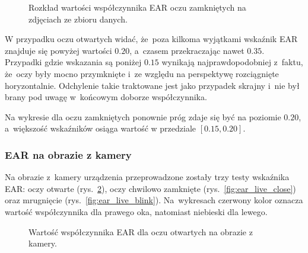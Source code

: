 \begin{figure}[!h]
    \centering
    \caption{Rozkład  wartości współczynnika EAR oczu zamkniętych na zdjęciach ze zbioru danych.}
    \label{fig:ear_static_close}
\end{figure}

W przypadku oczu otwartych widać, że~poza kilkoma wyjątkami wskaźnik EAR znajduje się powyżej wartości $0.20$, a~czasem przekraczając nawet $0.35$. Przypadki gdzie wskazania są poniżej $0.15$ wynikają najprawdopodobniej z~faktu, że~oczy były mocno przymknięte i~ze względu na perspektywę rozciągnięte horyzontalnie. Odchylenie takie traktowane jest jako przypadek skrajny i~nie był brany pod uwagę w~końcowym doborze współczynnika.

\par

Na wykresie dla oczu zamkniętych ponownie próg zdaje się być na poziomie $0.20$, a~większość wskaźników osiąga wartość w przedziale $[0.15, 0.20]$. 



\subsubsection{EAR na obrazie z kamery}

Na obrazie z~kamery urządzenia przeprowadzone zostały trzy testy wskaźnika EAR: oczy otwarte (rys.~\ref{fig:ear_live_open}), oczy chwilowo zamknięte (rys.~\ref{fig:ear_live_close}) oraz mrugnięcie (rys.~\ref{fig:ear_live_blink}). Na~wykresach czerwony kolor oznacza wartość współczynnika dla prawego oka, natomiast niebieski dla lewego.


\begin{figure}[!h]
    \centering
    \caption{Wartość współczynnika EAR dla oczu otwartych na obrazie z kamery.}
    \label{fig:ear_live_open}
\end{figure}


